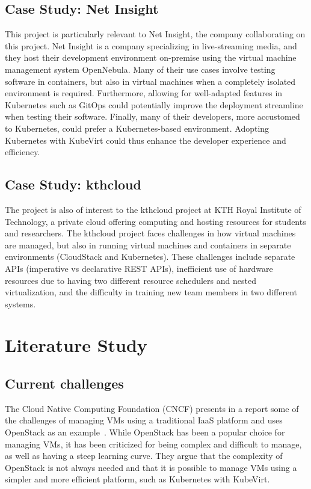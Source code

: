 \documentclass{article}
\begin{document}
\subsection{Case Study: Net Insight}
This project is particularly relevant to Net Insight, the company collaborating on this project. Net Insight is a company specializing in live-streaming media, and they host their development environment on-premise using the virtual machine management system OpenNebula. Many of their use cases involve testing software in containers, but also in virtual machines when a completely isolated environment is required. Furthermore, allowing for well-adapted features in Kubernetes such as GitOps \cite{k8s-gitops} could potentially improve the deployment streamline when testing their software. Finally, many of their developers, more accustomed to Kubernetes, could prefer a Kubernetes-based environment. Adopting Kubernetes with KubeVirt could thus enhance the developer experience and efficiency.

\subsection{Case Study: kthcloud}
The project is also of interest to the kthcloud project \cite{kthcloud}\cite{kthcloud-web} at KTH Royal Institute of Technology, a private cloud offering computing and hosting resources for students and researchers. The kthcloud project faces challenges in how virtual machines are managed, but also in running virtual machines and containers in separate environments (CloudStack and Kubernetes). These challenges include separate APIs (imperative vs declarative REST APIs), inefficient use of hardware resources due to having two different resource schedulers and nested virtualization, and the difficulty in training new team members in two different systems. 


\section{Literature Study}
\subsection{Current challenges}
The Cloud Native Computing Foundation (CNCF) presents in a report some of the challenges of managing VMs using a traditional IaaS platform and uses OpenStack as an example\ \cite{kubevirt-cncf}. While OpenStack has been a popular choice for managing VMs, it has been criticized for being complex and difficult to manage, as well as having a steep learning curve. They argue that the complexity of OpenStack is not always needed and that it is possible to manage VMs using a simpler and more efficient platform, such as Kubernetes with KubeVirt. 
\end{document}
